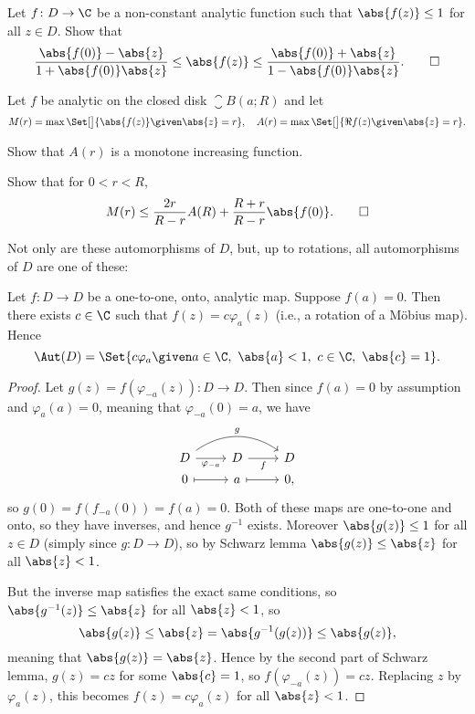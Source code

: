 \begin{exercise}
	Let $f \colon D \to \C$ be a non-constant analytic function such that $\abs{f(z)} \leq 1$ for all $z \in D$.
	Show that
	\[
		\frac{\abs{f(0)} - \abs{z}}{1 + \abs{f(0)} \abs{z}} \leq \abs{f(z)} \leq \frac{\abs{f(0)} + \abs{z}}{1 - \abs{f(0)} \abs{z}}. \qedhere
	\]
\end{exercise}

\begin{exercise}
	Let $f$ be analytic on the closed disk $\closure{B(a; R)}$ and let
	\[
		M(r) = \max\Set[\big]{ \abs{f(z)} \given \abs{z} = r}, \quad A(r) = \max\Set[\big]{\Re f(z) \given \abs{z} = r}.
	\]
	\begin{parts}
		\item Show that $A(r)$ is a monotone increasing function.
		\item Show that for $0 < r < R$,
		\[
			M(r) \leq \frac{2 r}{R - r} A(R) + \frac{R + r}{R - r} \abs{f(0)}. \qedhere
		\]
	\end{parts}
\end{exercise}

Not only are these automorphisms of $D$, but, up to rotations, all automorphisms of $D$ are one of these:

\begin{theorem}\label{thm6.4}
	Let $f \colon D \to D$ be a one-to-one, onto, analytic map.
	Suppose $f(a) = 0$.
	Then there exists $c \in \C$ such that $f(z) = c \varphi_a(z)$ (i.e., a rotation of a Möbius map).
	Hence
	\[
		\Aut(D) = \Set{c \varphi_a \given a \in \C,~ \abs{a} < 1,~ c \in \C,~ \abs{c} = 1}.
	\]
\end{theorem}

\begin{proof}
	Let $g(z) = f(\varphi_{-a}(z)) \colon D \to D$.
	Then since $f(a) = 0$ by assumption and $\varphi_a(a) = 0$, meaning that $\varphi_{-a}(0) = a$, we have
	\[
		\begin{tikzcd}
			D \arrow[r, "\varphi_{-a}"']\arrow[rr, "g", bend left=35] & D \arrow[r, "f"'] & D \\[-15pt]
			0 \arrow[r, mapsto] & a \arrow[r, mapsto] & 0,
		\end{tikzcd}
	\]
	so $g(0) = f(f_{-a}(0)) = f(a) = 0$.
	Both of these maps are one-to-one and onto, so they have inverses, and hence $g^{-1}$ exists.
	Moreover $\abs{g(z)} \leq 1$ for all $z \in D$ (simply since $g \colon D \to D$), so by Schwarz lemma $\abs{g(z)} \leq \abs{z}$ for all $\abs{z} < 1$.

	But the inverse map satisfies the exact same conditions, so $\abs{g^{-1}(z)} \leq \abs{z}$ for all $\abs{z} < 1$, so
	\[
		\abs{g(z)} \leq \abs{z} = \abs{g^{-1}(g(z))} \leq \abs{g(z)},
	\]
	meaning that $\abs{g(z)} = \abs{z}$.
	Hence by the second part of Schwarz lemma, $g(z) = c z$ for some $\abs{c} = 1$, so $f(\varphi_{-a}(z)) = c z$.
	Replacing $z$ by $\varphi_a(z)$, this becomes $f(z) = c \varphi_a(z)$ for all $\abs{z} < 1$.
\end{proof}


